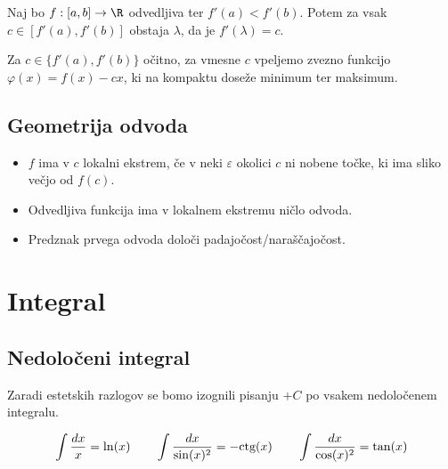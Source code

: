 \documentclass[12pt, a4paper, unicode]{article}
\begin{document}
\begin{izrek}
Naj bo $f:[a,b] \to \R$ odvedljiva ter $f'(a) < f'(b)$. Potem za vsak $c \in [f'(a),f'(b)]$ obstaja $\lambda$, da je $f'(\lambda) = c$.
\end{izrek}
\begin{oris}
Za $c \in \{f'(a),f'(b)\}$ očitno, za vmesne $c$ vpeljemo zvezno funkcijo $\varphi(x) = f(x) - cx$, ki na kompaktu doseže minimum ter maksimum. 
\end{oris}

\subsection{Geometrija odvoda}
\begin{definicija}
\begin{itemize}
    \item $f$ ima v $c$ lokalni ekstrem, če v neki $\varepsilon$ okolici $c$ ni nobene točke, ki ima sliko večjo od $f(c)$. 
    \item Odvedljiva funkcija ima v lokalnem ekstremu ničlo odvoda.
    \item Predznak prvega odvoda določi padajočost/naraščajočost.
\end{itemize}
\end{definicija}

\newpage
\section{Integral}
\subsection{Nedoločeni integral}
Zaradi estetskih razlogov se bomo izognili pisanju $+C$ po vsakem nedoločenem integralu.
\begin{naloga}[Standardni]
\[
\int \frac{dx}{x} = \ln(x) \quad \quad \int \frac{dx}{\sin(x)^2} = -\text{ctg}(x) \quad \quad \int \frac{dx}{\cos(x)^2} = \tan(x) \\
\]
\end{naloga}
\end{document}
